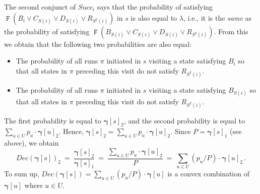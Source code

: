 \documentclass[a4paper,UKenglish,cleveref, autoref, thm-restate]{lipics-v2021}
\newcommand{\Succ}{\mathit{Succ}}
\newcommand{\DEC}{\mathit{Dec}}
\renewcommand{\vec}[1]{\pmb{#1}}
\newcommand{\cv}{\vec{\gamma}}
\newcommand*{\opf}{\operatorname{\pmb{\mathtt{F}}}}
\begin{document}
The second conjunct of $\Succ_i$ says that the probability of satisfying 
$\opf(B_i {\vee} C_{S(i)} {\vee} D_{S(i)} {\vee} R_{S^2(i)})$ in $s$ is also equal to $\lambda$, i.e., it is the \emph{same} as the probability of satisfying $\opf(B_{S(i)} {\vee} C_{S(i)} {\vee} D_{S(i)} {\vee} R_{S^2(i)})$. From this we obtain that
the following two probabilities are also equal:
\begin{itemize}
    \item The probability of all runs $\pi$ initiated in $s$ visiting a state satisfying $B_i$ so that all states in $\pi$ preceding this visit do not satisfy $R_{S^2(i)}$. 
    \item The probability of all runs $\pi$ initiated in $s$ visiting a state satisfying 
    $B_{S(i)}$  so that all states in $\pi$ preceding this visit do not satisfy $R_{S^2(i)}$. 
\end{itemize}
The first probability is equal to $\cv[s]_2$, and the second probability is equal to $\sum_{u \in U}p_u \cdot \cv[u]_2$. Hence, $\cv[s]_2 =  \sum_{u \in U}p_u \cdot \cv[u]_2$. Since $P = \cv[s]_1$ (see above), we obtain
\[
   \DEC(\cv[s])_2 \ = \ \frac{\cv[s]_2}{\cv[s]_1} \ = \ \frac{\sum_{u \in U}p_u \cdot \cv[u]_2}{P}
   \ = \ \sum_{u \in U} (p_u/P) \cdot \cv[u]_2\,.
\]
To sum up, $\DEC(\cv[s]) =  \sum_{u \in U} (p_u/P) \cdot \cv[u]$ is a convex combination of $\cv[u]$ where $u \in U$. 
\end{document}
